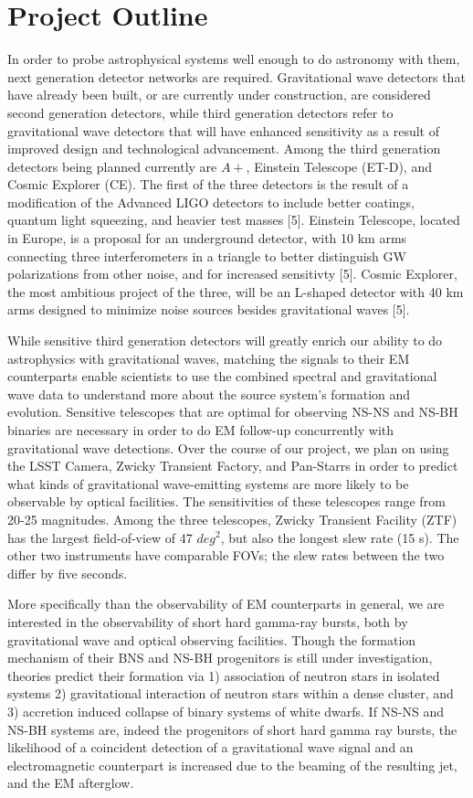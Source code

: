 \documentclass{article}
\begin{document}
\section{Project Outline}

In order to probe astrophysical systems well enough to do astronomy with them, next generation detector networks are required.  Gravitational wave detectors that have already been built, or are currently under construction, are considered second generation detectors, while third generation detectors refer to gravitational wave detectors that will have enhanced sensitivity as a result of improved design and technological advancement.  Among the third generation detectors being planned currently are $A+$, Einstein Telescope (ET-D), and Cosmic Explorer (CE).  The first of the three detectors is the result of a modification of the Advanced LIGO detectors to include better coatings, quantum light squeezing, and heavier test masses [5].  Einstein Telescope, located in Europe, is a proposal for an underground detector, with 10 km arms connecting three interferometers in a triangle to better distinguish GW polarizations from other noise, and for increased sensitivty [5].  Cosmic Explorer, the most ambitious project of the three, will be an L-shaped detector with 40 km arms designed to minimize noise sources besides gravitational waves [5].    
 
While sensitive third generation detectors will greatly enrich our ability to do astrophysics with gravitational waves, matching the signals to their EM counterparts enable scientists to use the combined spectral and gravitational wave data to understand more about the source system's formation and evolution.  Sensitive telescopes that are optimal for observing NS-NS and NS-BH binaries are necessary in order to do EM follow-up concurrently with gravitational wave detections.  Over the course of our project, we plan on using the LSST Camera, Zwicky Transient Factory, and Pan-Starrs in order to predict what kinds of gravitational wave-emitting systems are more likely to be observable by optical facilities.  The sensitivities of these telescopes range from ~ 20-25 magnitudes.  Among the three telescopes, Zwicky Transient Facility (ZTF) has the largest field-of-view of 47 $deg^2$, but also the longest slew rate (15 s).  The other two instruments have comparable FOVs; the slew rates between the two differ by five seconds.  

More specifically than the observability of EM counterparts in general, we are interested in the observability of short hard gamma-ray bursts, both by gravitational wave and optical observing facilities.  Though the formation mechanism of their BNS and NS-BH progenitors is still under investigation, theories predict their formation via 1) association of neutron stars in isolated systems 2) gravitational interaction of neutron stars within a dense cluster, and 3) accretion induced collapse of binary systems of white dwarfs.  If NS-NS and NS-BH systems are, indeed the progenitors of short hard gamma ray bursts, the likelihood of a coincident detection of a gravitational wave signal and an electromagnetic counterpart is increased due to the beaming of the resulting jet, and the EM afterglow.
\end{document}
